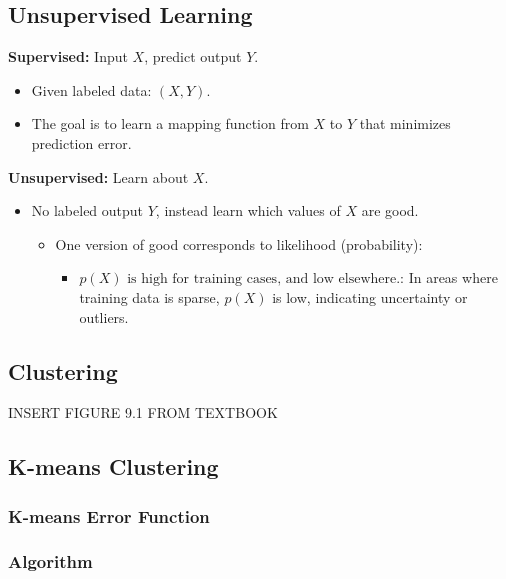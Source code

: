 \subsection{Unsupervised Learning}
\begin{intuition}

    \textbf{Supervised:} Input \( X \), predict output \( Y \).
    \begin{itemize}
        \item Given labeled data: \( (X, Y) \).
        \item The goal is to learn a mapping function from \( X \) to \( Y \) that minimizes prediction error.
    \end{itemize}

    \textbf{Unsupervised:} Learn about \( X \).
    \begin{itemize}
        \item No labeled output \( Y \), instead learn which values of \( X \) are good.
        \begin{itemize}
            \item One version of good corresponds to likelihood (probability): 
            \begin{itemize}
                \item $p(X) \text{ is high for training cases, and low elsewhere.}$: In areas where training data is sparse, \( p(X) \) is low, indicating uncertainty or outliers.
            \end{itemize}
        \end{itemize}
    \end{itemize}
\end{intuition}

\subsection{Clustering}
\begin{intuition}
    INSERT FIGURE 9.1 FROM TEXTBOOK
\end{intuition}

\subsection{K-means Clustering}
\subsubsection{K-means Error Function}

\subsubsection{Algorithm}

